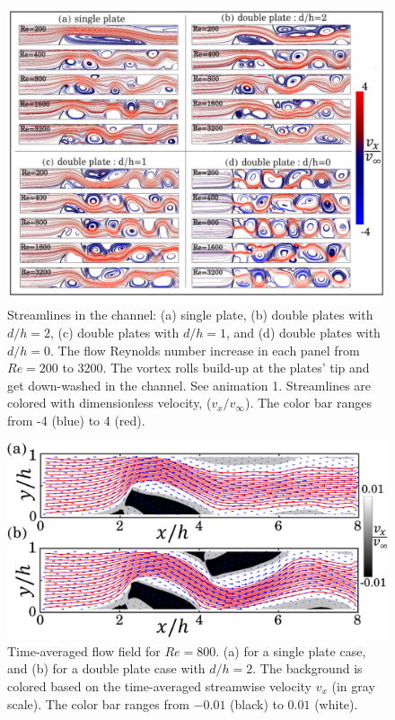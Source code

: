 \documentclass[aps,pre,twocolumn,aps,longbibliography]{revtex4-1}
\begin{document}
	
	\begin{figure}
		\begin{minipage}[c]{1\linewidth}
			\includegraphics[width=1\linewidth]{Fig08.pdf} 
		\end{minipage} 
		\caption{Streamlines in the channel: (a) single plate, (b) double plates with $d/h=2$, (c) double plates with $d/h=1$, and (d) double plates with $d/h=0$. The flow Reynolds number increase in each panel from $Re=200$ to 3200. The vortex rolls build-up at the plates' tip and get down-washed in the channel. See animation 1. Streamlines are colored with dimensionless velocity, ($v_x/v_{\infty}$). The color bar ranges from -4 (blue) to 4 (red).}
		\label{fig:streamlines}
	\end{figure}
	
	\begin{figure}[b]
		\begin{minipage}{1\linewidth}
			\includegraphics[width=1\linewidth]{Fig09.pdf} 
		\end{minipage} 
		\caption{Time-averaged flow field for $Re=800$. (a) for a single plate case, and (b) for a double plate case with $d/h=2$. The background is colored based on the time-averaged streamwise velocity $v_x$ (in gray scale). The color bar ranges from $-0.01$ (black) to $0.01$ (white).}
		\label{fig:stream_timeavg}
	\end{figure}
	
\end{document}
